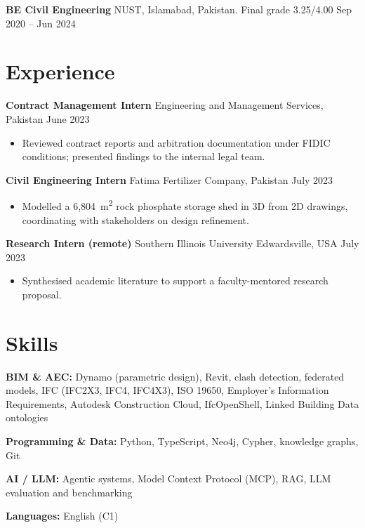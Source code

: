 \documentclass[a4paper,10.5pt]{article}
\newcommand{\datefill}{\dotfill}
\newcommand{\entry}[3]{\vspace{2.5pt}\noindent\textbf{#1} \textbar{} #2 \datefill{} #3\par\vspace{0.5pt}}
\newcommand{\skillrow}[2]{\noindent\textbf{#1:} #2\par\vspace{1pt}}
\begin{document}
\entry{BE Civil Engineering}{NUST, Islamabad, Pakistan. Final grade 3.25/4.00}{Sep 2020 -- Jun 2024}

\section{Experience}
\entry{Contract Management Intern}{Engineering and Management Services, Pakistan}{June 2023}
\begin{itemize}
  \item Reviewed contract reports and arbitration documentation under FIDIC
        conditions; presented findings to the internal legal team.
\end{itemize}

\entry{Civil Engineering Intern}{Fatima Fertilizer Company, Pakistan}{July 2023}
\begin{itemize}
  \item Modelled a 6,804~m\textsuperscript{2} rock phosphate storage shed in 3D from
        2D drawings, coordinating with stakeholders on design refinement.
\end{itemize}

\entry{Research Intern (remote)}{Southern Illinois University Edwardsville, USA}{July 2023}
\begin{itemize}
  \item Synthesised academic literature to support a faculty-mentored research proposal.
\end{itemize}

\section{Skills}

\skillrow{BIM \& AEC}{Dynamo (parametric design), Revit, clash detection, federated models, IFC (IFC2X3, IFC4, IFC4X3), ISO 19650, Employer's Information Requirements, Autodesk Construction Cloud, IfcOpenShell, Linked Building Data ontologies}
\skillrow{Programming \& Data}{Python, TypeScript, Neo4j, Cypher, knowledge graphs, Git}
\skillrow{AI / LLM}{Agentic systems, Model Context Protocol (MCP), RAG, LLM evaluation and benchmarking}

\skillrow{Languages}{English (C1)}
\end{document}
